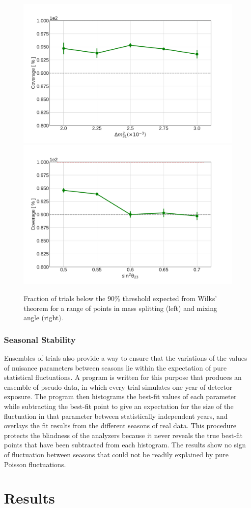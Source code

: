 \begin{figure}
    \centering
    \includegraphics[width=0.45\linewidth]{figures/measurement/three_flavor/coverage_test/coverage_dm_v3.pdf}
    \includegraphics[width=0.45\linewidth]{figures/measurement/three_flavor/coverage_test/coverage_t23_v3.pdf}
    \caption{Fraction of trials below the 90\% threshold expected from Wilks' theorem for a range of points in mass splitting (left) and mixing angle (right).}
    \label{fig:three-flavor-coverage}
\end{figure}

\subsubsection{Seasonal Stability}

Ensembles of trials also provide a way to ensure that the variations of the values of nuisance parameters between seasons lie within the expectation of pure statistical fluctuations. A program is written for this purpose that produces an ensemble of pseudo-data, in which every trial simulates one year of detector exposure. The program then histograms the best-fit values of each parameter while subtracting the best-fit point to give an expectation for the size of the fluctuation in that parameter between statistically independent years, and overlays the fit results from the different seasons of real data. This procedure protects the blindness of the analyzers because it never reveals the true best-fit points that have been subtracted from each histogram. The results show no sign of fluctuation between seasons that could not be readily explained by pure Poisson fluctuations.


\section{Results}

